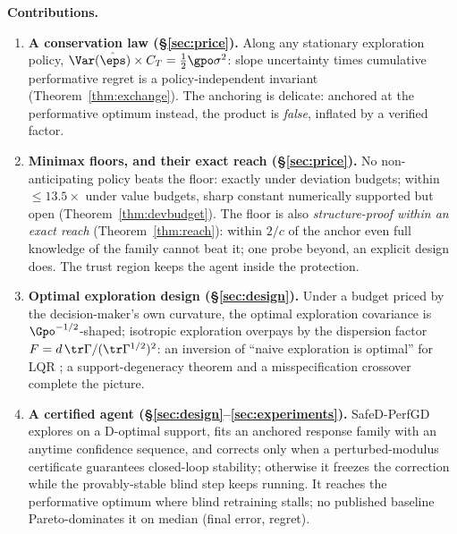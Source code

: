 \documentclass{article}
\begin{document}
\textbf{Contributions.}
\begin{enumerate}\itemsep1pt
\item \textbf{A conservation law (\S\ref{sec:price}).} Along any stationary exploration policy, $\Var(\hat\eps)\times C_T = \tfrac{1}{2}\gpo\sigma^2$: slope uncertainty times cumulative performative regret is a policy-independent invariant (Theorem~\ref{thm:exchange}). The anchoring is delicate: anchored at the performative optimum instead, the product is \emph{false}, inflated by a verified factor.
\item \textbf{Minimax floors, and their exact reach (\S\ref{sec:price}).} No non-anticipating policy beats the floor: exactly under deviation budgets; within $\le 13.5\times$ under value budgets, sharp constant numerically supported but open (Theorem~\ref{thm:devbudget}). The floor is also \emph{structure-proof within an exact reach} (Theorem~\ref{thm:reach}): within $2/c$ of the anchor even full knowledge of the family cannot beat it; one probe beyond, an explicit design does. The trust region keeps the agent inside the protection.
\item \textbf{Optimal exploration design (\S\ref{sec:design}).} Under a budget priced by the decision-maker's own curvature, the optimal exploration covariance is $\Gpo^{-1/2}$-shaped; isotropic exploration overpays by the dispersion factor $F = d\,\tr\Gamma/(\tr\Gamma^{1/2})^2$: an inversion of ``naive exploration is optimal'' for LQR \citep{simchowitz2020naive}; a support-degeneracy theorem and a misspecification crossover complete the picture.
\item \textbf{A certified agent (\S\ref{sec:design}--\ref{sec:experiments}).} SafeD-PerfGD explores on a D-optimal support, fits an anchored response family with an anytime confidence sequence, and corrects only when a perturbed-modulus certificate guarantees closed-loop stability; otherwise it freezes the correction while the provably-stable blind step keeps running. It reaches the performative optimum where blind retraining stalls; no published baseline Pareto-dominates it on median (final error, regret).
\end{enumerate}
\end{document}
